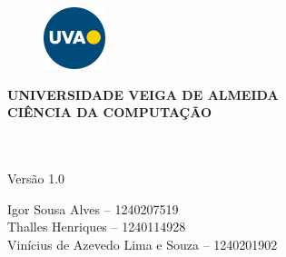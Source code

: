 \begin{titlepage}
    
    \centering
    
    \begin{figure}[h]
        \centering
        \includegraphics[width=1.8cm]{Figuras/uva.png}
    \end{figure}
        
    \textbf{
        \uppercase{
            Universidade Veiga de Almeida \\
            Ciência da Computação
        }
    }

    
    
    \vfill

    \textbf{\uppercase\expandafter{\expanded{\TitleName}}} \\
    \SubtitleName \\
    Versão 1.0
    
        
    \vfill 

    Igor Sousa Alves -- 1240207519 \\
    Thalles Henriques -- 1240114928 \\
    Vinícius de Azevedo Lima e Souza -- 1240201902 

        
    \vfill 

    \printCity \\
    \the \year

\end{titlepage}
